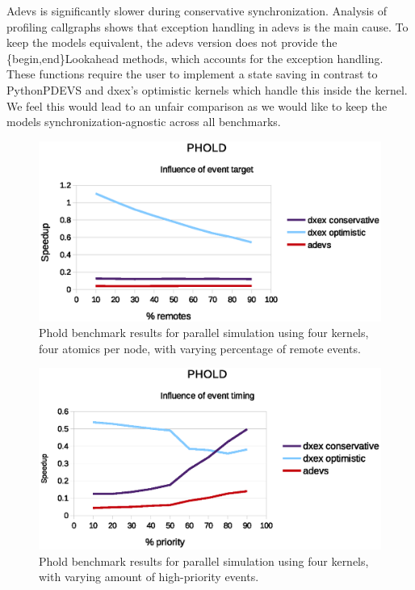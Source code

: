 Adevs is significantly slower during conservative synchronization.
Analysis of profiling callgraphs shows that exception handling in adevs is the main cause. 
To keep the models equivalent, the adevs version does not provide the \{begin,end\}Lookahead methods, which accounts for the exception handling.
These functions require the user to implement a state saving in contrast to PythonPDEVS and dxex's optimistic kernels which handle this inside the kernel.
We feel this would lead to an unfair comparison as we would like to keep the models synchronization-agnostic across all benchmarks.

\begin{figure}
    \center
    \includegraphics[width=\columnwidth]{fig/phold_remotes.eps}
    \caption{Phold benchmark results for parallel simulation using four kernels, four atomics per node, with varying percentage of remote events.}
\end{figure}
\begin{figure}
	\center
	\includegraphics[width=\columnwidth]{fig/phold_priority.eps}
	\caption{Phold benchmark results for parallel simulation using four kernels, with varying amount of high-priority events.}
	\label{fig:phold_priority}
\end{figure}

